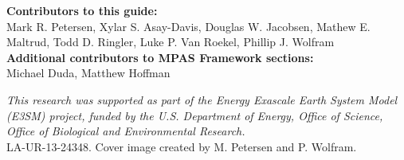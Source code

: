 \vspace{8pt}
\noindent
{\bf Contributors to this guide:}\\
Mark R. Petersen, Xylar S. Asay-Davis, 
Douglas W. Jacobsen, Mathew E. Maltrud, Todd D. Ringler,
Luke P. Van Roekel, 
Phillip J. Wolfram
\\
{\bf Additional contributors to MPAS Framework sections:}\\
Michael Duda, Matthew Hoffman

\vspace{8pt}
\noindent
{\scriptsize
{\it This research was supported as part of the Energy Exascale Earth System Model
(E3SM) project, funded by the U.S. Department of Energy, Office of Science,
Office of Biological and Environmental Research.
} \\
LA-UR-13-24348. Cover image created by M. Petersen and P. Wolfram.}





